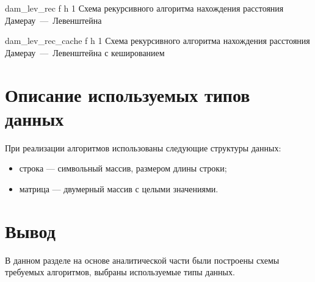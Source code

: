 	{dam_lev_rec} %
	{f} %
	{h} %
	{1\textwidth} %
	{Схема рекурсивного алгоритма нахождения расстояния Дамерау~---~Левенштейна} %
\clearpage

	{dam_lev_rec_cache} %
	{f} %
	{h} %
	{1\textwidth} %
	{Схема рекурсивного алгоритма нахождения расстояния Дамерау~---~Левенштейна с кешированием} %
\clearpage

\section{Описание используемых типов данных}

При реализации алгоритмов использованы следующие структуры данных:

\begin{itemize}
	\item строка --- символьный массив, размером длины строки;
	\item матрица --- двумерный массив с целыми значениями.
\end{itemize}

\section*{Вывод}

В данном разделе на основе аналитической части были построены схемы
требуемых алгоритмов, выбраны используемые типы данных.